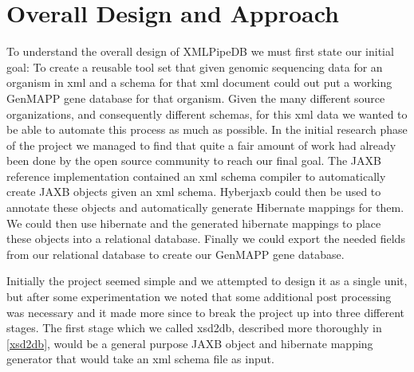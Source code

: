 \section{Overall Design and Approach}
To understand the overall design of XMLPipeDB we must first state our initial goal:  To create a reusable tool set that given genomic sequencing data for an organism in xml and a schema for that xml document could out put a working GenMAPP gene database for that organism.  Given the many different source organizations, and consequently different schemas,  for this xml data we wanted to be able to automate this process as much as possible.  In the initial research phase of the project we managed to find that quite a fair amount of work had already been done by the open source community to reach our final goal.  The JAXB reference implementation contained an xml schema compiler to automatically create JAXB objects given an xml schema.   Hyberjaxb could then be used to annotate these objects and automatically generate Hibernate mappings for them.  We could then use hibernate and the generated hibernate mappings to place these objects into a relational  database.  Finally we could export the needed fields from our relational database to create our GenMAPP gene database. 

Initially the project seemed simple and we attempted to design it as a single unit, but after some experimentation we noted that some additional post processing was necessary and it made more since to break the project up into three different stages.  The first stage which we called xsd2db, described more thoroughly in \ref{xsd2db}, would be a general purpose JAXB object and hibernate mapping generator that would take an xml schema file as input.  